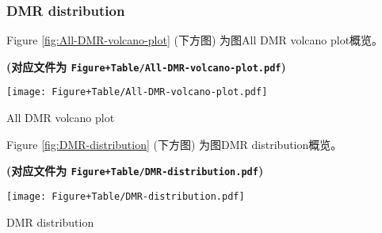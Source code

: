 \documentclass[
]{article}
\begin{document}
\begin{center}\vspace{1.5cm}\end{center}

\hypertarget{dmr-distribution}{%
\subsubsection{DMR distribution}\label{dmr-distribution}}

\begin{center}\vspace{1.5cm}\end{center}

Figure \ref{fig:All-DMR-volcano-plot} (下方图) 为图All DMR volcano plot概览。

\textbf{(对应文件为 \texttt{Figure+Table/All-DMR-volcano-plot.pdf})}

\def\@captype{figure}
\begin{center}
\texttt{[image: Figure+Table/All-DMR-volcano-plot.pdf]}
\caption{All DMR volcano plot}\label{fig:All-DMR-volcano-plot}
\end{center}

\begin{center}\vspace{1.5cm}\end{center}

\begin{center}\vspace{1.5cm}\end{center}

Figure \ref{fig:DMR-distribution} (下方图) 为图DMR distribution概览。

\textbf{(对应文件为 \texttt{Figure+Table/DMR-distribution.pdf})}

\def\@captype{figure}
\begin{center}
\texttt{[image: Figure+Table/DMR-distribution.pdf]}
\caption{DMR distribution}\label{fig:DMR-distribution}
\end{center}

\begin{center}\vspace{1.5cm}\end{center}
\end{document}
